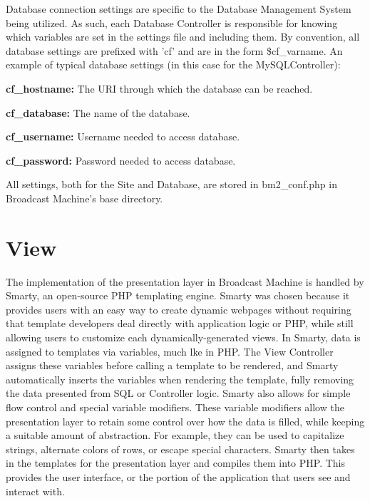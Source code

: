 \documentclass[a4paper,12pt]{report}
\begin{document}
Database connection settings are specific to the Database Management System being utilized. As such, each Database Controller is responsible for knowing which variables are set in the settings file and including them. By convention, all database settings are prefixed with 'cf' and are in the form \$cf\_varname. An example of typical database settings (in this case for the MySQLController): \\

\begin{description}
\item{\textbf{cf\_hostname: } The URI through which the database can be reached.}
\item{\textbf{cf\_database: } The name of the database.}
\item{\textbf{cf\_username: } Username needed to access database.}
\item{\textbf{cf\_password: } Password needed to access database.} \\
\end{description}

All settings, both for the Site and Database, are stored in bm2\_conf.php in Broadcast Machine's base directory.

\section{View}
The implementation of the presentation layer in Broadcast Machine is handled by Smarty, an open-source PHP templating engine. 
Smarty was chosen because it provides users with an easy way to create dynamic webpages without requiring that template developers deal directly with application logic or PHP, while still allowing users to customize each dynamically-generated views. In Smarty, data is assigned to templates via variables, much lke in PHP. The View Controller assigns these variables before calling a template to be rendered, and Smarty automatically inserts the variables when rendering the template, fully removing the data presented from SQL or Controller logic.
Smarty also allows for simple flow control and special variable modifiers.
These variable modifiers allow the presentation layer to retain some control over how the data is filled, while keeping a suitable amount of abstraction.
For example, they can be used to capitalize strings, alternate colors of rows, or escape special characters.
Smarty then takes in the templates for the presentation layer and compiles them into PHP. This provides the user interface, or the portion of the application that users see and interact with.
\end{document}

